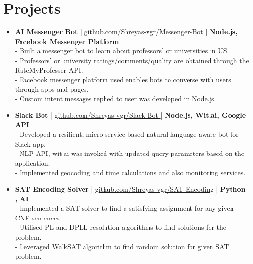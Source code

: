 \section{Projects}
\begin{itemize}
 \item \textbf{AI Messenger Bot} | \href{https://github.com/Shreyas-vgr/Messenger-Bot}{github.com/Shreyas-vgr/Messenger-Bot} | \textbf{Node.js, Facebook Messenger Platform}\\
 - Built a messenger bot to learn about professors' or universities in US.\\
 - Professors' or university ratings/comments/quality are obtained through the RateMyProfessor API.\\
 - Facebook messenger platform used enables bots to converse with users through apps and pages.\\
 - Custom intent messages replied to user was developed in Node.js.

 \item \textbf{Slack Bot} | \href{https://github.com/Shreyas-vgr/Slack-Bot}{github.com/Shreyas-vgr/Slack-Bot }| \textbf{Node.js, Wit.ai, Google API}\\
 - Developed a resilient, micro-service based natural language aware bot for Slack app.\\
 - NLP API, wit.ai was invoked with updated query parameters based on the application.\\
 - Implemented geocoding and time calculations and also monitoring services.

 \item \textbf{SAT Encoding Solver} | \href{https://github.com/Shreyas-vgr/SAT-Encoding}{github.com/Shreyas-vgr/SAT-Encoding} | \textbf{Python , AI}\\
 - Implemented a SAT solver to find a satisfying assignment for any given CNF sentences.\\
 - Utilised PL and DPLL resolution algorithms to find solutions for the problem.\\
 - Leveraged WalkSAT algorithm to find random solution for given SAT problem.



\end{itemize}
